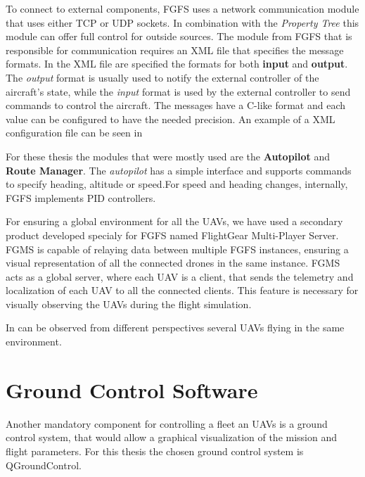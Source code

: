 To connect to external components, FGFS uses a network communication module
that uses either TCP or UDP sockets. In combination with the \textit{Property Tree}
this module can offer full control for outside sources. The module from FGFS that
is responsible for communication requires an XML file that specifies the message 
formats. In the XML file are specified the formats for both 
\textbf{input} and \textbf{output}. The \textit{output} format is 
usually used to notify the external controller of the aircraft's state, while
the \textit{input} format is used by the external controller to send commands
to control the aircraft. The messages have a C-like format and each value can
be configured to have the needed precision. An example of a XML configuration file
can be seen in 

For these thesis the modules that were mostly used are the \textbf{Autopilot} and
\textbf{Route Manager}. The \textit{autopilot} has a simple interface and supports
commands to specify heading, altitude or speed.For speed and heading changes,
internally, FGFS implements PID controllers.

For ensuring a global environment for all the UAVs, we have used a secondary product
developed specialy for FGFS named FlightGear Multi-Player Server. FGMS is capable of relaying data between
multiple FGFS instances, ensuring a visual representation of all the connected
  drones in the same instance. FGMS acts as a global server, where each
UAV is a client, that sends the telemetry and localization of each UAV to all
the connected clients. This feature is necessary for visually observing the UAVs during the flight 
simulation.

In  can be observed from different perspectives 
several UAVs flying in the same environment.


\chapter{Ground Control Software}
\label{sec:qgc}

Another mandatory component for controlling a fleet an UAVs is a ground control
system, that would allow a graphical visualization of the mission and 
flight parameters. For this thesis the chosen ground control system is QGroundControl.

